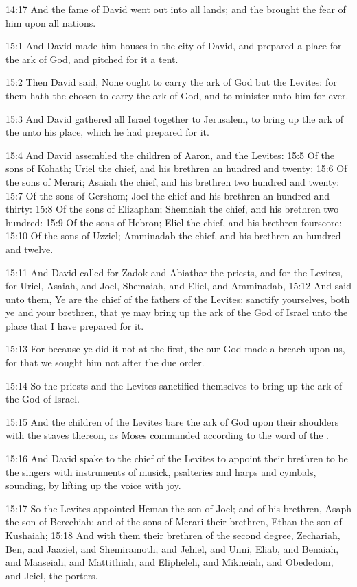 14:17 And the fame of David went out into all lands; and the \LORD
brought the fear of him upon all nations.

15:1 And David made him houses in the city of David, and prepared a
place for the ark of God, and pitched for it a tent.

15:2 Then David said, None ought to carry the ark of God but the
Levites: for them hath the \LORD chosen to carry the ark of God, and to
minister unto him for ever.

15:3 And David gathered all Israel together to Jerusalem, to bring up
the ark of the \LORD unto his place, which he had prepared for it.

15:4 And David assembled the children of Aaron, and the Levites: 15:5
Of the sons of Kohath; Uriel the chief, and his brethren an hundred
and twenty: 15:6 Of the sons of Merari; Asaiah the chief, and his
brethren two hundred and twenty: 15:7 Of the sons of Gershom; Joel the
chief and his brethren an hundred and thirty: 15:8 Of the sons of
Elizaphan; Shemaiah the chief, and his brethren two hundred: 15:9 Of
the sons of Hebron; Eliel the chief, and his brethren fourscore: 15:10
Of the sons of Uzziel; Amminadab the chief, and his brethren an
hundred and twelve.

15:11 And David called for Zadok and Abiathar the priests, and for the
Levites, for Uriel, Asaiah, and Joel, Shemaiah, and Eliel, and
Amminadab, 15:12 And said unto them, Ye are the chief of the fathers
of the Levites: sanctify yourselves, both ye and your brethren, that
ye may bring up the ark of the \LORD God of Israel unto the place that
I have prepared for it.

15:13 For because ye did it not at the first, the \LORD our God made a
breach upon us, for that we sought him not after the due order.

15:14 So the priests and the Levites sanctified themselves to bring up
the ark of the \LORD God of Israel.

15:15 And the children of the Levites bare the ark of God upon their
shoulders with the staves thereon, as Moses commanded according to the
word of the \LORD.

15:16 And David spake to the chief of the Levites to appoint their
brethren to be the singers with instruments of musick, psalteries and
harps and cymbals, sounding, by lifting up the voice with joy.

15:17 So the Levites appointed Heman the son of Joel; and of his
brethren, Asaph the son of Berechiah; and of the sons of Merari their
brethren, Ethan the son of Kushaiah; 15:18 And with them their
brethren of the second degree, Zechariah, Ben, and Jaaziel, and
Shemiramoth, and Jehiel, and Unni, Eliab, and Benaiah, and Maaseiah,
and Mattithiah, and Elipheleh, and Mikneiah, and Obededom, and Jeiel,
the porters.

